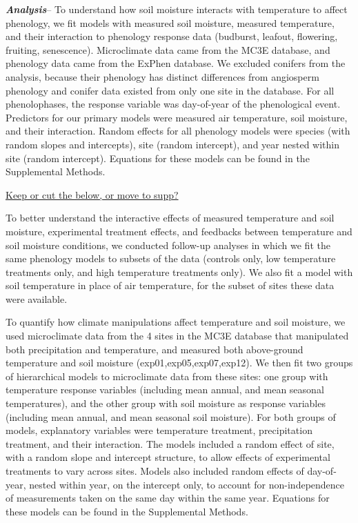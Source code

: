 \documentclass{article}
\begin{document}
\textbf {\emph{Analysis}}--
To understand how soil moisture interacts with temperature to affect phenology, we fit models with measured soil moisture, measured temperature, and their interaction to phenology response data (budburst, leafout, flowering, fruiting, senescence). Microclimate data came from the MC3E database, and phenology data came from the ExPhen database. We excluded conifers from the analysis, because their phenology has distinct differences from angiosperm phenology \cite{polgar2014} and conifer data existed from only one site in the database. For all phenolophases, the response variable was day-of-year of the phenological event. Predictors for our primary models were measured air temperature, soil moisture, and their interaction. Random effects for all phenology models were species (with random slopes and intercepts), site (random intercept), and year nested within site (random intercept). Equations for these models can be found in the Supplemental Methods. 
\par \underline{Keep or cut the below, or move to supp?} 
\par To better understand the interactive effects of measured temperature and soil moisture, experimental treatment effects, and feedbacks between temperature and soil moisture conditions, we conducted follow-up analyses in which we fit the same phenology models to subsets of the data (controls only, low temperature treatments only, and high temperature treatments only). We also fit a model with soil temperature in place of air temperature, for the subset of sites these data were available. 
\par To quantify how climate manipulations affect temperature and soil moisture, we used microclimate data from the 4 sites in the MC3E database that manipulated both precipitation and temperature, and measured both above-ground temperature and soil moisture (exp01,exp05,exp07,exp12). We then fit two groups of hierarchical models to microclimate data from these sites: one group with temperature response variables (including mean annual, and mean seasonal temperatures), and the other group with soil moisture as response variables (including mean annual, and mean seasonal soil moisture). For both groups of models, explanatory variables were temperature treatment, precipitation treatment, and their interaction. The models included a random effect of site, with a random slope and intercept structure, to allow effects of experimental treatments to vary across sites. Models also included random effects of day-of-year, nested within year, on the intercept only, to account for non-independence of measurements taken on the same day within the same year. Equations for these models can be found in the Supplemental Methods. 
\end{document}

